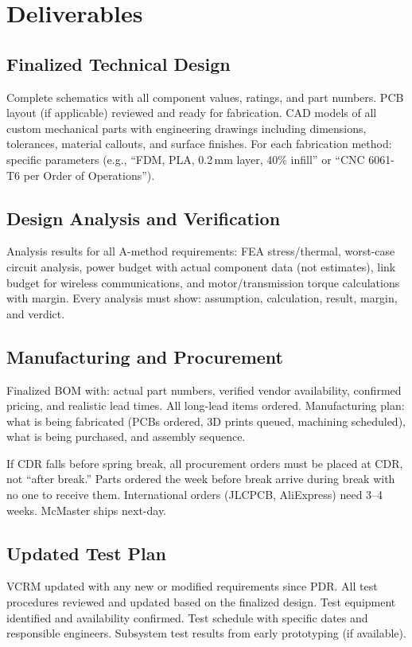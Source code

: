 \section{Deliverables}

\subsection{Finalized Technical Design}
Complete schematics with all component values, ratings, and part numbers. PCB layout (if applicable) reviewed and ready for fabrication. CAD models of all custom mechanical parts with engineering drawings including dimensions, tolerances, material callouts, and surface finishes. For each fabrication method: specific parameters (e.g., ``FDM, PLA, 0.2\,mm layer, 40\% infill'' or ``CNC 6061-T6 per Order of Operations'').

\subsection{Design Analysis and Verification}
Analysis results for all A-method requirements: FEA stress/thermal, worst-case circuit analysis, power budget with actual component data (not estimates), link budget for wireless communications, and motor/transmission torque calculations with margin. Every analysis must show: assumption, calculation, result, margin, and verdict.

\subsection{Manufacturing and Procurement}
Finalized BOM with: actual part numbers, verified vendor availability, confirmed pricing, and realistic lead times. All long-lead items ordered. Manufacturing plan: what is being fabricated (PCBs ordered, 3D prints queued, machining scheduled), what is being purchased, and assembly sequence.

\begin{tipbox}
If CDR falls before spring break, all procurement orders must be placed at CDR, not ``after break.'' Parts ordered the week before break arrive during break with no one to receive them. International orders (JLCPCB, AliExpress) need 3--4 weeks. McMaster ships next-day.
\end{tipbox}

\subsection{Updated Test Plan}
VCRM updated with any new or modified requirements since PDR. All test procedures reviewed and updated based on the finalized design. Test equipment identified and availability confirmed. Test schedule with specific dates and responsible engineers. Subsystem test results from early prototyping (if available).



